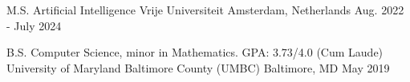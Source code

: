 
\begin{cventries}
  \cventry
    {M.S. Artificial Intelligence} %
    {Vrije Universiteit} %
    {Amsterdam, Netherlands} %
    {Aug. 2022 - July 2024} %
    {}

  \cventry
    {B.S. Computer Science, minor in Mathematics.  GPA: 3.73/4.0 (Cum Laude)} %
    {University of Maryland Baltimore County (UMBC)} %
    {Baltimore, MD} %
    {May 2019} %
    {
    }

\end{cventries}
